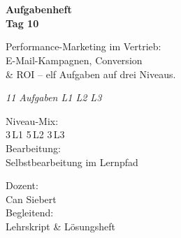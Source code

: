 \documentclass[11pt,a4paper,oneside]{article}
\newcommand{\caveatfontfallback}{\itshape}
\newcommand\caveatfont{\caveatfontfallback}%
\begin{document}
\begin{titlepage}
  \pagestyle{empty}
  \vspace*{1.5cm}
  \\[2pt]
  \noindent{\color{lpAccent}\rule{\linewidth}{1.2pt}}\\[4pt]

  \vspace{3cm}
  {\sffamily\fontsize{30}{34}\selectfont\bfseries\color{lpInk}Aufgabenheft\\Tag 10\par}

  \vspace{0.7cm}
  {\sffamily\large\color{lpGray}Performance-Marketing im Vertrieb:\\E-Mail-Kampagnen, Conversion\\\& ROI -- elf Aufgaben auf drei Niveaus.\par}

  \vspace{1.5cm}
  {\caveatfont\LARGE\color{lpAmber}11 Aufgaben \textperiodcentered{} L1 \textperiodcentered{} L2 \textperiodcentered{} L3}\par

  \vfill

  \noindent\begin{minipage}{0.55\linewidth}
    {\sffamily\footnotesize\color{lpGray}Niveau-Mix:}\\
    {\sffamily\small\color{lpInk}3\,\textsf{L1} \textperiodcentered{} 5\,\textsf{L2} \textperiodcentered{} 3\,\textsf{L3}}\\[10pt]
    {\sffamily\footnotesize\color{lpGray}Bearbeitung:}\\
    {\sffamily\small\color{lpInk}Selbstbearbeitung im Lernpfad}
  \end{minipage}\hfill
  \begin{minipage}{0.4\linewidth}
    \raggedleft
    {\sffamily\footnotesize\color{lpGray}Dozent:}\\
    {\sffamily\small\color{lpInk}Can Siebert}\\[10pt]
    {\sffamily\footnotesize\color{lpGray}Begleitend:}\\
    {\sffamily\small\color{lpInk}Lehrskript \& Lösungsheft}
  \end{minipage}

  \vspace{0.5cm}
  \noindent{\color{lpAccent}\rule{\linewidth}{0.6pt}}
\end{titlepage}
\end{document}

